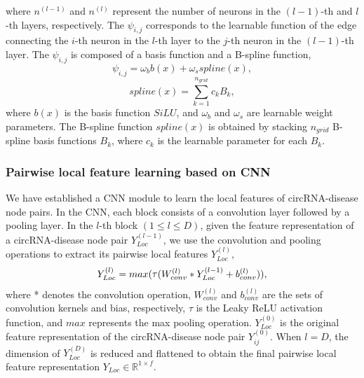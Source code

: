 \documentclass[journal=jcisd8,manuscript=article]{achemso}
\begin{document}
where $n^{(l - 1)}$ and $n^{(l)}$ represent the number of neurons in the $(l - 1)$-th and $l$-th layers, respectively. The $\psi_{i,j}$ corresponds to the learnable function of the edge connecting the $i$-th neuron in the $l$-th layer to the $j$-th neuron in the $(l - 1)$-th layer. The $\psi_{i,j}$ is composed of a basis function and a B-spline function,
\begin{equation}
    \psi_{i,j} = \omega_{b}b(x) + \omega_{s}spline(x),
\end{equation}
\begin{equation}
    spline(x) = \sum_{k = 1}^{n_{grid}}c_{k} B_{k},
\end{equation}
where $b(x)$ is the basis function ${SiLU}$, and $\omega_{b}$ and $\omega_{s}$ are learnable weight parameters. The B-spline function $spline(x)$ is obtained by stacking $n_{grid}$ B-spline basis functions $B_{k}$, where $c_{k}$ is the learnable parameter for each $B_{k}$.
\vspace{-0.5cm}

\subsubsection{Pairwise local feature learning based on CNN}
\vspace{-0.3cm}
We have established a CNN module to learn the local features of circRNA-disease node pairs. In the CNN, each block consists of a convolution layer followed by a pooling layer. In the $l$-th block $(1 \leqslant l \leqslant D)$, given the feature representation of a circRNA-disease node pair ${Y}_{Loc}^{(l - 1)}$, we use the convolution and pooling operations to extract its pairwise local features ${Y}_{Loc}^{(l)}$,
\begin{equation}
{Y}_{Loc}^{(l)} = max(\mathop{\rm{\tau}}({W_{conv}^{(l)}}  * {Y}_{Loc}^{(l - 1)} + {b_{conv}^{(l)}})),
\end{equation}
where * denotes the convolution operation, $W_{conv}^{(l)}$ and $b_{conv}^{(l)}$ are the sets of convolution kernels and bias, respectively, $\tau$ is the Leaky ReLU activation function, and $max$ represents the max pooling operation. $Y_{Loc}^{(0)}$ is the original feature representation of the circRNA-disease node pair $Y_{ij}^{(0)}$. When $l = D$, the dimension of $Y_{Loc}^{(D)}$ is reduced and flattened to obtain the final pairwise local feature representation $Y_{Loc} \in \mathbb{R}^{1\times f}$.
\vspace{-0.5cm}
\end{document}
